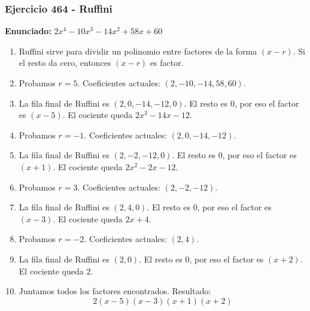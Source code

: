 \documentclass[11pt,a4paper]{article}
\begin{document}
\subsubsection*{Ejercicio 464 - Ruffini}
\textbf{Enunciado:} $ 2 x^{4} - 10 x^{3} - 14 x^{2} + 58 x + 60 $\par
\begin{enumerate}[leftmargin=2em]
\item Ruffini sirve para dividir un polinomio entre factores de la forma \((x-r)\). Si el resto da cero, entonces \((x-r)\) es factor.
\item Probamos \(r=5\). Coeficientes actuales: \((2, -10, -14, 58, 60)\).
\item La fila final de Ruffini es \((2, 0, -14, -12, 0)\). El resto es \(0\), por eso el factor es \((x-5)\). El cociente queda \(2 x^{3} - 14 x - 12\).
\item Probamos \(r=-1\). Coeficientes actuales: \((2, 0, -14, -12)\).
\item La fila final de Ruffini es \((2, -2, -12, 0)\). El resto es \(0\), por eso el factor es \((x+1)\). El cociente queda \(2 x^{2} - 2 x - 12\).
\item Probamos \(r=3\). Coeficientes actuales: \((2, -2, -12)\).
\item La fila final de Ruffini es \((2, 4, 0)\). El resto es \(0\), por eso el factor es \((x-3)\). El cociente queda \(2 x + 4\).
\item Probamos \(r=-2\). Coeficientes actuales: \((2, 4)\).
\item La fila final de Ruffini es \((2, 0)\). El resto es \(0\), por eso el factor es \((x+2)\). El cociente queda \(2\).
\item Juntamos todos los factores encontrados. Resultado: \[\boxed{2 \left(x - 5\right) \left(x - 3\right) \left(x + 1\right) \left(x + 2\right)}\]
\end{enumerate}

\vspace{0.2cm}
\end{document}
